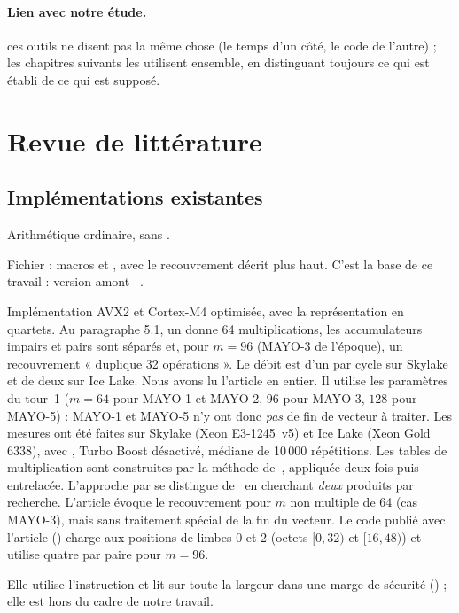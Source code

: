 \paragraph{Lien avec notre étude.} ces outils ne disent pas la même chose (le temps d'un côté, le code de l'autre) ; les chapitres suivants les utilisent ensemble, en distinguant toujours ce qui est établi de ce qui est supposé.

\section{Revue de littérature}\label{sec:revue}
\subsection{Implémentations existantes}
\begin{description}[leftmargin=0.5cm]
\item[Référence C.] Arithmétique ordinaire, sans \vpshufb{}.
\item[AVX2 officiel (MAYO-C).] Fichier  : macros  et , avec le recouvrement décrit plus haut. C'est la base de ce travail : version amont ~\cite{mayoc}.
\item[\emph{Nibbling MAYO}~\cite{nibbling}.] Implémentation AVX2 et Cortex-M4 optimisée, avec la représentation en quartets. Au paragraphe 5.1, un \vpshufb{} donne 64 multiplications, les accumulateurs impairs et pairs sont séparés et, pour $m=96$ (MAYO-3 de l'époque), un recouvrement « duplique 32 opérations ». Le débit est d'un \vpshufb{} par cycle sur Skylake et de deux sur Ice Lake. Nous avons lu l'article en entier. Il utilise les paramètres du tour~1 ($m=64$ pour MAYO-1 et MAYO-2, $96$ pour MAYO-3, $128$ pour MAYO-5) : MAYO-1 et MAYO-5 n'y ont donc \emph{pas} de fin de vecteur à traiter. Les mesures ont été faites sur Skylake (Xeon E3-1245~v5) et Ice Lake (Xeon Gold 6338), avec , Turbo Boost désactivé, médiane de 10\,000 répétitions. Les tables de multiplication sont construites par la méthode de~\cite{bch23}, appliquée deux fois puis entrelacée. L'approche par \vpshufb{} se distingue de~\cite{bch23} en cherchant \emph{deux} produits par recherche. L'article évoque le recouvrement pour $m$ non multiple de 64 (cas MAYO-3), mais sans traitement spécial de la fin du vecteur. Le code publié avec l'article () charge aux positions de limbes 0 et 2 (octets $[0,32)$ et $[16,48)$) et utilise quatre \vpshufb{} par paire pour $m=96$.
\item[Version GFNI.] Elle utilise l'instruction  et lit sur toute la largeur dans une marge de sécurité () ; elle est hors du cadre de notre travail.
\end{description}


